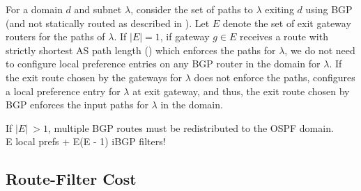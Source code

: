 For a domain $d$ and subnet $\lambda$, consider the set 
of paths to $\lambda$ exiting $d$ using BGP (and not statically
routed as described in ). Let $E$ denote the
set of exit gateway routers for the paths of $\lambda$. 
If $|E| = 1$, if gateway $g \in E$ receives a route with 
strictly shortest AS path length () 
which enforces the paths
for $\lambda$, we do not need to configure local preference
entries on any BGP router in the domain for $\lambda$. If
the exit route chosen by the gateways for $\lambda$ does not 
enforce the paths, \name configures a local preference entry
for $\lambda$ at exit gateway, and thus, the exit route chosen
by BGP enforces the input paths for $\lambda$ in the domain.

If $|E| ~> 1$, multiple BGP routes must be redistributed to 
the OSPF domain. \\
E local prefs + E(E - 1) iBGP filters!


\subsection{Route-Filter Cost}









